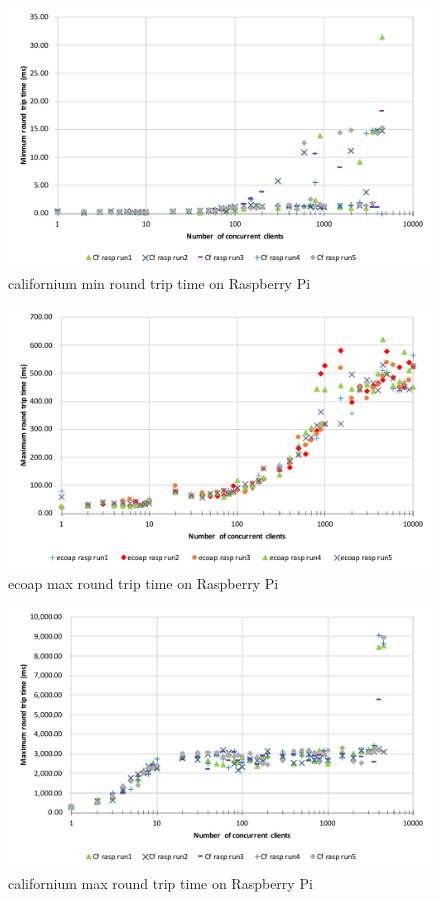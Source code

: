 \begin{figure}[!htbp]
\centering
\includegraphics[scale = 0.8]{californium_min_round_trip_time_rasp}
\caption{californium min round trip time on Raspberry Pi}
\label{fig:californium_min_round_trip_time_rasp}
\end{figure}

\begin{figure}[!htbp]
\centering
\includegraphics[scale = 0.8]{ecoap_max_round_trip_time_rasp}
\caption{ecoap max round trip time on Raspberry Pi}
\label{fig:ecoap_max_round_trip_time_rasp}
\end{figure}

\begin{figure}[!htbp]
\centering
\includegraphics[scale = 0.8]{californium_max_round_trip_time_rasp}
\caption{californium max round trip time on Raspberry Pi}
\label{fig:californium_max_round_trip_time_rasp}
\end{figure}

